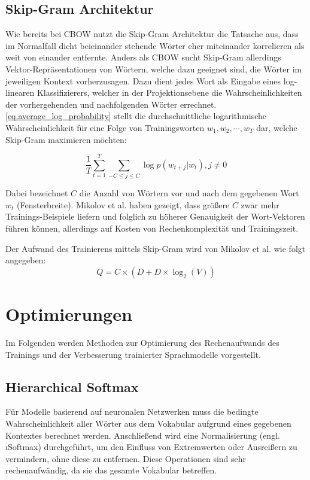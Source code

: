 \subsection{Skip-Gram Architektur}\label{ss.skipgram}
Wie bereits bei CBOW nutzt die Skip-Gram Architektur die Tatsache aus, dass im Normalfall dicht beieinander stehende Wörter eher miteinander korrelieren als weit von einander entfernte. Anders als CBOW sucht Skip-Gram allerdings Vektor-Repräsentationen von Wörtern, welche dazu geeignet sind, die Wörter im jeweiligen Kontext vorherzusagen. Dazu dient jedes Wort als Eingabe eines log-linearen Klassifizierers, welcher in der Projektionsebene die Wahrscheinlichkeiten der vorhergehenden und nachfolgenden Wörter errechnet. \autoref{eq.average_log_probability} stellt die durchschnittliche logarithmische Wahrscheinlichkeit für eine Folge von Trainingsworten $w_1, w_2, \cdots, w_T$ dar, welche Skip-Gram maximieren möchten:

\begin{equation}
    \frac{1}{T}\sum_{t=1}^T\sum_{-C\leq j \leq C} \log p\left(w_{t+j}|w_t\right), j \neq 0  \label{eq.average_log_probability}
\end{equation}

Dabei bezeichnet $C$ die Anzahl von Wörtern vor und nach dem gegebenen Wort $w_t$ (Fensterbreite). Mikolov et al. haben gezeigt, dass größere $C$ zwar mehr Trainings-Beispiele liefern und folglich zu höherer Genauigkeit der Wort-Vektoren führen können, allerdings auf Kosten von Rechenkomplexität und Trainingszeit.

Der Aufwand des Trainierens mittels Skip-Gram wird von Mikolov et al. wie folgt angegeben:
\begin{equation}
    Q = C \times (D + D \times \log_2(V)) \label{eq.complexitiy_skipgram}
\end{equation}

\section{Optimierungen}\label{ss.modellverbesserungen}
Im Folgenden werden Methoden zur Optimierung des Rechenaufwands des Trainings und der Verbesserung trainierter Sprachmodelle vorgestellt.

\subsection{Hierarchical Softmax}\label{ss.hierarchical_softmax}
Für Modelle basierend auf neuronalen Netzwerken muss die bedingte Wahrscheinlichkeit aller Wörter aus dem Vokabular aufgrund eines gegebenen Kontextes berechnet werden. Anschließend wird eine Normalisierung (engl. \i{Softmax}) durchgeführt, um den Einfluss von Extremwerten oder Ausreißern zu vermindern, ohne diese zu entfernen. Diese Operationen sind sehr rechenaufwändig, da sie das gesamte Vokabular betreffen.

